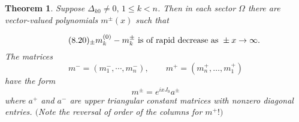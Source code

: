 \documentclass{surv-l}
\theoremstyle{plain}
\newtheorem{theorem}{Theorem}[section]
\theoremstyle{definition}
\numberwithin{equation}{chapter}
\begin{document}
\setcounter{theorem}{18}
\begin{theorem}\label{thm8.19} Suppose $\Delta_{k0}\neq 0,\, 1\leq k<n$. Then in each sector $\Omega$ there are vector-valued polynomials $m^{\pm}(x)$ such that

\begin{equation*}
\tag*{$(8.20)_{\pm}$}  m_{k}^{(0)}-m_{k}^{\pm} \text{ is of rapid decrease as }\pm x\rightarrow\infty.
\end{equation*}
The matrices
\renewcommand\theequation{\thesection.\arabic{equation}}
\setcounter{equation}{20}
\begin{equation}\label{eq8.21}
m^{-}=(m_{1}^{-}, \cdots , m_{n}^{-}),\qquad m^{+}=(m_{n}^{+}, \ldots, m_{1}^{+})
\end{equation}
have the form
\begin{equation}\label{eq8.22}
m^{\pm}=e^{ixJ_{0}}a^{\pm}
\end{equation}
where $a^{+}$ and $a^{-}$ are upper triangular constant matrices with nonzero diagonal entries. $($Note the reversal of order of the columns for $m^{+}!)$
\end{theorem}
\end{document}
